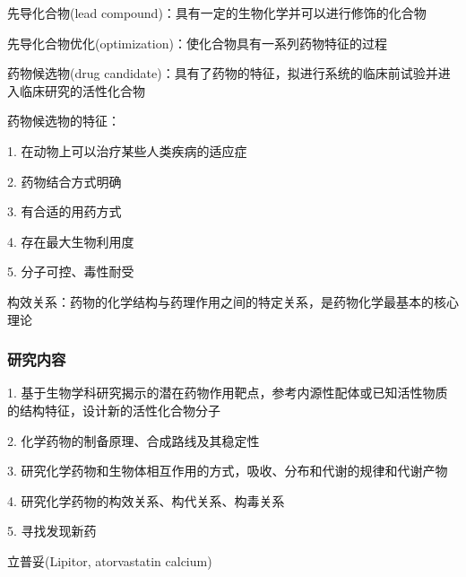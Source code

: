 \begin{defi}
    先导化合物(lead compound)：具有一定的生物化学并可以进行修饰的化合物
\end{defi}
\begin{defi}
    先导化合物优化(optimization)：使化合物具有一系列药物特征的过程
\end{defi}
\begin{defi}
    药物候选物(drug candidate)：具有了药物的特征，拟进行系统的临床前试验并进入临床研究的活性化合物
\end{defi}
\begin{notation}
    药物候选物的特征：

    1. 在动物上可以治疗某些人类疾病的适应症

    2. 药物结合方式明确

    3. 有合适的用药方式

    4. 存在最大生物利用度

    5. 分子可控、毒性耐受
\end{notation}
\begin{defi}
    构效关系：药物的化学结构与药理作用之间的特定关系，是药物化学最基本的核心理论
\end{defi}
\subsubsection{研究内容}%
\label{subsub:研究内容}
1. 基于生物学科研究揭示的潜在药物作用靶点，参考内源性配体或已知活性物质的结构特征，设计新的活性化合物分子

2. 化学药物的制备原理、合成路线及其稳定性

3. 研究化学药物和生物体相互作用的方式，吸收、分布和代谢的规律和代谢产物

4. 研究化学药物的构效关系、构代关系、构毒关系

5. 寻找发现新药
\begin{eg}
    立普妥(Lipitor, atorvastatin calcium)
\end{eg}
